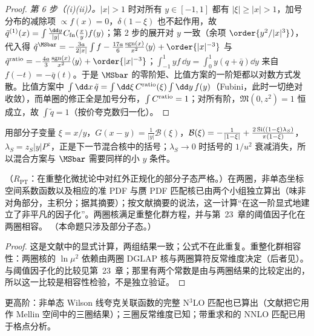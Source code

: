 \begin{proof}
\emph{第 6 步（(i)(ii)）。}$|x|>1$ 时对所有 $y\in[-1,1]$ 都有 $|\xi|\ge|x|>1$，加号分布的减除项 $\propto f(x)=0$，$\delta(1-\xi)$ 也不起作用，故 $\tilde q^{(1)}(x)=\int\frac{\dd y}{|y|}C_{\rm fn}(\frac xy)f(y)$；第 2 步的展开对 $y$ 一致（余项 $\order{y^2/|x|^3}$），代入得 $\tilde q^{\MSbar}=-\frac{3a}{2|x|}\int f-\frac{17a}6\frac{{\rm sgn}(x)}{x^2}\langle y\rangle+\order{|x|^{-3}}$ 与 $\tilde q^{\rm ratio}=-\frac{4a}3\frac{{\rm sgn}(x)}{x^2}\langle y\rangle+\order{|x|^{-3}}$；$\int_{-1}^1yf\,\dd y=\int_0^1y(q+\bar q)\dd y$ 来自 $f(-t)=-\bar q(t)$。于是 $\MSbar$ 的零阶矩、比值方案的一阶矩都以对数方式发散。比值方案中 $\int\dd x\,\tilde q=\int\dd\xi\,C^{\rm ratio}(\xi)\int\dd y\,f(y)$（Fubini，此时一切绝对收敛），而单圈的修正全是加号分布，$\int C^{\rm ratio}=1$；对所有阶，$\mathfrak M(0,z^2)=1$ 恒成立，故 $\int\tilde q=1$（按价夸克数归一化）。
\end{proof}

用部分子变量 $\xi=x/y$，$G(x-y)=\frac1{|y|}\mathcal B(\xi)$，$\mathcal B(\xi)=-\frac1{|1-\xi|}+\frac{2\,{\rm Si}((1-\xi)\lambda_S)}{\pi(1-\xi)}$，$\lambda_S=z_S|y|P^z$，正是下一节混合核中的括号；$\lambda_S\to0$ 时括号的 $1/u^2$ 衰减消失，所以混合方案与 $\MSbar$ 需要同样的小 $y$ 条件。

\begin{proposition}\label{prop:lamet-twoloop}
（$R_{\mathrm{PT}}$：在重整化微扰论中对红外正规化的部分子态严格。）在两圈，非单态坐标空间系数函数以及相应的准 PDF 与赝 PDF 匹配核已由两个小组独立算出\cite{Li:2020xml,Chen:2020ody}（味非对角部分\cite{Chen:2020arf}，主积分\cite{Chen:2020iqi}；据其摘要）；按文献\cite{Chen:2020ody}摘要的说法，这一计算“在这一阶显式地建立了非平凡的因子化”。两圈核满足重整化群方程，并与第~23~章的阈值因子化在两圈相容。
（本命题只涉及部分子态。）
\end{proposition}

\begin{proof}
这是文献中的显式计算\cite{Li:2020xml,Chen:2020ody}，两组结果一致；公式不在此重复。重整化群相容性：两圈核的 $\ln\mu^2$ 依赖由两圈 DGLAP 核与两圈算符反常维度决定（后者见\cite{Braun:2020ymy}）。与阈值因子化的比较见第~23~章；那里有两个常数是由与两圈结果的比较定出的，所以这一比较是相容性检验，不是独立验证。
\end{proof}

更高阶：非单态 Wilson 线夸克关联函数的完整 N$^3$LO 匹配也已算出\cite{Cheng:2024wyu}（文献\cite{Ji:2024hit}把它用作 Mellin 空间中的三圈结果）；三圈反常维度已知\cite{Braun:2020ymy}；带重求和的 NNLO 匹配已用于格点分析\cite{Gao:2021dbh,Su:2022fiu}。

